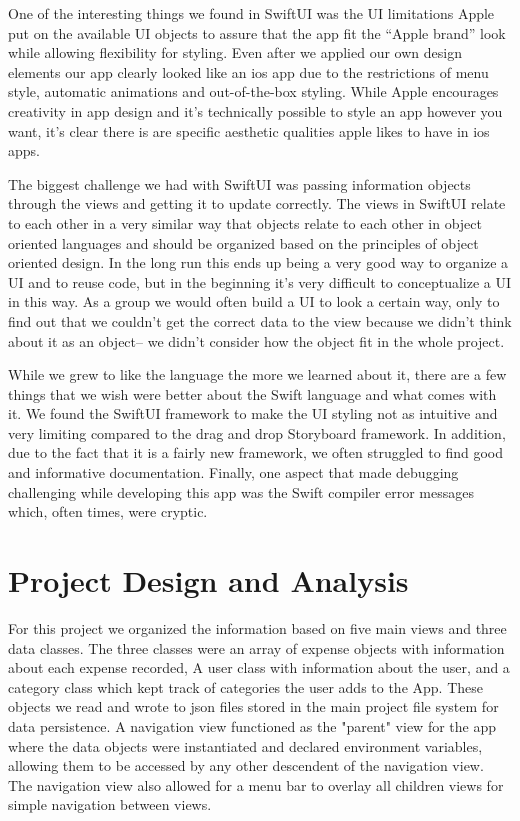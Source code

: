 \documentclass{article}
\begin{document}
\vskip 0.2in

One of the interesting things we found in SwiftUI was the UI limitations Apple put on the available UI objects to assure that the app fit the “Apple brand” look while allowing flexibility for styling. Even after we applied our own design elements our app clearly looked like an ios app due to the restrictions of menu style, automatic animations and out-of-the-box styling. While Apple encourages creativity in app design and it's technically possible to style an app however you want, it's clear there is are specific aesthetic qualities apple likes to have in ios apps. \par

\vskip 0.2in

The biggest challenge we had with SwiftUI was passing information objects through the views and getting it to update correctly. The views in SwiftUI relate to each other in a very similar way that objects relate to each other in object oriented languages and should be organized based on the principles of object oriented design. In the long run this ends up being a very good way to organize a UI and to reuse code, but in the beginning it’s very difficult to conceptualize a UI in this way. As a group we would often build a UI to look a certain way, only to find out that we couldn't get the correct data to the view because we didn't think about it as an object-- we didn't consider how the object fit in the whole project. 

\vskip 0.2in

While we grew to like the language the more we learned about it, there are a few things that we wish were better about the Swift language and what comes with it. We found the SwiftUI framework to make the UI styling not as intuitive and very limiting compared to the drag and drop Storyboard framework. In addition, due to the fact that it is a fairly new framework, we often struggled to find good and informative documentation. Finally, one aspect that made debugging challenging while developing this app was the Swift compiler error messages which, often times, were cryptic. 

\section{Project Design and Analysis}

For this project we organized the information based on five main views and three data classes. The three classes were an array of expense objects with information about each expense recorded, A user class with information about the user, and a category class which kept track of categories the user adds to the App. These objects we read and wrote to json files stored in the main project file system for data persistence. A navigation view functioned as the "parent" view for the app where the data objects were instantiated and declared environment variables, allowing them to be accessed by any other descendent of the navigation view. The navigation view also allowed for a menu bar to overlay all children views for simple navigation between views.
\end{document}
